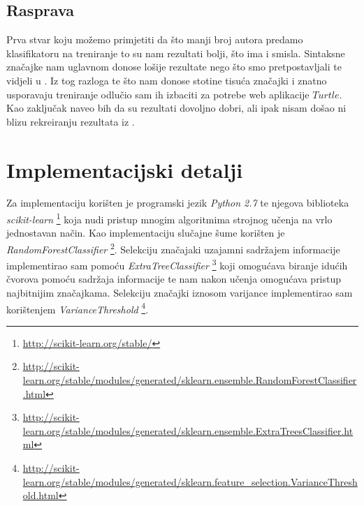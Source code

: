 \subsection{Rasprava}

Prva stvar koju možemo primjetiti da što manji broj autora predamo klasifikatoru na treniranje to su nam rezultati bolji, što ima i smisla. Sintaksne značajke nam uglavnom donose lošije rezultate nego što smo pretpostavljali te vidjeli u \cite{islam}. Iz tog razloga te što nam donose stotine tisuća značajki i znatno usporavaju treniranje odlučio sam ih izbaciti za potrebe web aplikacije $Turtle$. Kao zaključak naveo bih da su rezultati dovoljno dobri, ali ipak nisam došao ni blizu rekreiranju rezultata iz \cite{islam}. 

\newpage

\section{Implementacijski detalji}

\renewcommand{\footnotesize}{\fontsize{8pt}{10pt}\selectfont}


Za implementaciju korišten je programski jezik \textit{Python 2.7} te njegova biblioteka \textit{scikit-learn} \footnote{\url{http://scikit-learn.org/stable/}} koja nudi pristup mnogim algoritmima strojnog učenja na vrlo jednostavan način. Kao implementaciju slučajne šume korišten je  \textit{RandomForestClassifier} \footnote{\url{http://scikit-learn.org/stable/modules/generated/sklearn.ensemble.RandomForestClassifier.html}}. Selekciju značajaki uzajamni sadržajem informacije implementirao sam pomoću \textit{ExtraTreeClassifier} \footnote{\url{http://scikit-learn.org/stable/modules/generated/sklearn.ensemble.ExtraTreesClassifier.html}} koji omogućava biranje idućih čvorova pomoću sadržaja informacije te nam nakon učenja omogućava pristup najbitnijim značajkama. Selekciju značajki iznosom varijance implementirao sam korištenjem  \textit{VarianceThreshold} \footnote{\url{http://scikit-learn.org/stable/modules/generated/sklearn.feature_selection.VarianceThreshold.html}}.

\newpage
